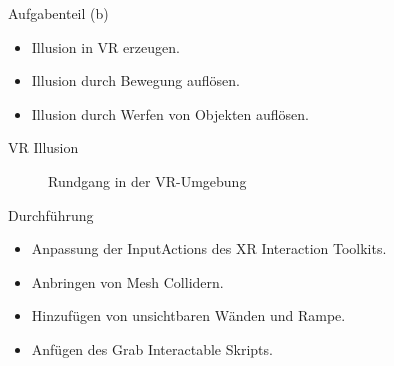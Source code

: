 \documentclass{beamer}
\begin{document}
\begin{frame}{Aufgabenteil (b)}
\begin{itemize}
\item Illusion in VR erzeugen.
\item Illusion durch Bewegung auflösen.
\item Illusion durch Werfen von Objekten auflösen.
\end{itemize}
\end{frame}


\begin{frame}{VR Illusion}
\begin{figure}
    \centering
\caption{Rundgang in der VR-Umgebung}
\end{figure}
\end{frame}


\begin{frame}{Durchführung}
\begin{itemize}
\item Anpassung der InputActions des XR Interaction Toolkits.
\item Anbringen von Mesh Collidern.
\item Hinzufügen von unsichtbaren Wänden und Rampe.
\item Anfügen des Grab Interactable Skripts.
\end{itemize}
\end{frame}
\end{document}
